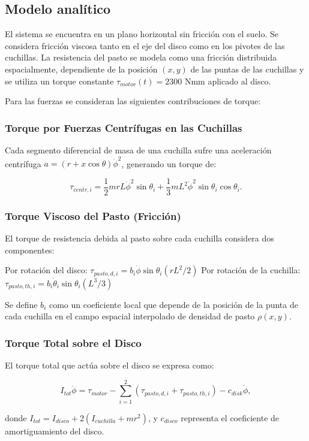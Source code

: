\documentclass[12pt]{article}
\begin{document}
\subsection{Modelo analítico}
El sistema se encuentra en un plano horizontal sin fricción con el suelo. Se considera fricción viscosa tanto en el eje del disco como en los pivotes de las cuchillas. La resistencia del pasto se modela como una fricción distribuida espacialmente, dependiente de la posición $(x, y)$ de las puntas de las cuchillas y se utiliza un torque constante $\tau_{motor}(t) = 2300$ Nmm aplicado al disco.

Para las fuerzas se consideran las siguientes contribuciones de torque:

\subsubsection{Torque por Fuerzas Centrífugas en las Cuchillas}
Cada segmento diferencial de masa de una cuchilla sufre una aceleración centrífuga $a = (r + x \cos \theta) \dot{\phi}^2$, generando un torque de:

$$
\tau_{centr, i} = \frac{1}{2}mrL \dot{\phi}^2 \sin \theta_i + \frac{1}{3}mL^2 \dot{\phi}^2 \sin \theta_i \cos \theta_i.
$$

\subsubsection{Torque Viscoso del Pasto (Fricción)}
El torque de resistencia debida al pasto sobre cada cuchilla considera dos componentes:

 Por rotación del disco:
  $\tau_{pasto,d,i} = b_i \dot{\phi} \sin \theta_i (r L^2 / 2)$
Por rotación de la cuchilla:
  $\tau_{pasto,th,i} = b_i \dot{\theta}_i \sin \theta_i (L^3 / 3)$

Se define $b_i$ como un coeficiente local que depende de la posición de la punta de cada cuchilla en el campo espacial interpolado de densidad de pasto $\rho(x, y)$.

\subsubsection{Torque Total sobre el Disco}
El torque total que actúa sobre el disco se expresa como:

$$
I_{tot} \ddot{\phi} = \tau_{motor} - \sum_{i=1}^{2} (\tau_{pasto,d,i} + \tau_{pasto,th,i}) - c_{disk} \dot{\phi},
$$

donde $I_{tot} = I_{disco} + 2(I_{cuchilla} + m r^2)$, y $c_{disco}$ representa el coeficiente de amortiguamiento del disco.
\end{document}
